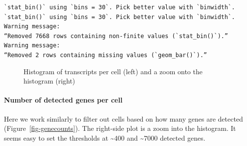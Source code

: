 \documentclass[
  letterpaper,
  DIV=11,
  numbers=noendperiod]{scrartcl}
\let\oldparagraph\paragraph
\renewcommand{\paragraph}[1]{\oldparagraph{#1}\mbox{}}
\begin{document}
\begin{verbatim}
`stat_bin()` using `bins = 30`. Pick better value with `binwidth`.
`stat_bin()` using `bins = 30`. Pick better value with `binwidth`.
Warning message:
“Removed 7668 rows containing non-finite values (`stat_bin()`).”
Warning message:
“Removed 2 rows containing missing values (`geom_bar()`).”
\end{verbatim}

\begin{figure}[H]


\caption{\label{fig-rnacount}Histogram of transcripts per cell (left)
and a zoom onto the histogram (right)}

\end{figure}%

\paragraph{Number of detected genes per
cell}\label{number-of-detected-genes-per-cell}

Here we work similarly to filter out cells based on how many genes are
detected (Figure~\ref{fig-genecounts}). The right-side plot is a zoom
into the histogram. It seems easy to set the thresholds at
\textasciitilde400 and \textasciitilde7000 detected genes.
\end{document}
